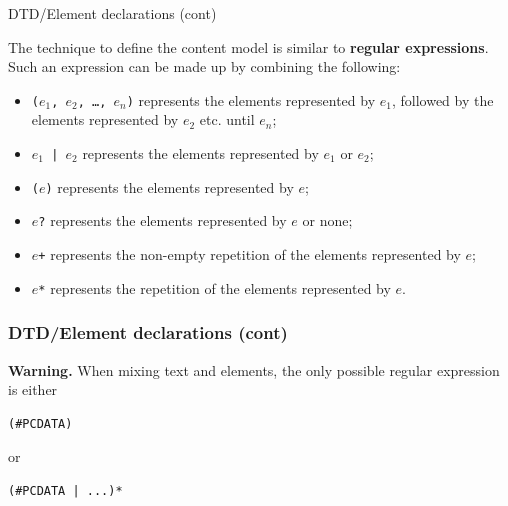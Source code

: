 %
\begin{frame}{DTD/Element declarations (cont)}

The technique to define the content model is similar to
\textbf{regular expressions}. Such an expression can be made up by
combining the following:
\begin{itemize}

  \item \texttt{(\(e_1\), \(e_2\), \dots , \(e_n\))} represents the
    elements represented by \(e_1\), followed by the elements
    represented by \(e_2\) etc. until \(e_n\);

  \item \texttt{\(e_1\) | \(e_2\)} represents the elements represented
    by \(e_1\) or \(e_2\);

  \item \texttt{(\(e\))} represents the elements represented by \(e\);

  \item \texttt{\(e\)?} represents the elements represented by \(e\)
    or none;

  \item \texttt{\(e\)+} represents the non-empty repetition of
    the elements represented by \(e\);

  \item \texttt{\(e\)*} represents the repetition of the elements
    represented by \(e\).

\end{itemize}

\end{frame}

%
\begin{frame}[containsverbatim]
\frametitle{DTD/Element declarations (cont)}

\textbf{Warning.} When mixing text and elements, the only possible
regular expression is either
\begin{verbatim}
(#PCDATA)
\end{verbatim}
or
\begin{verbatim}
(#PCDATA | ...)*
\end{verbatim}

\end{frame}


